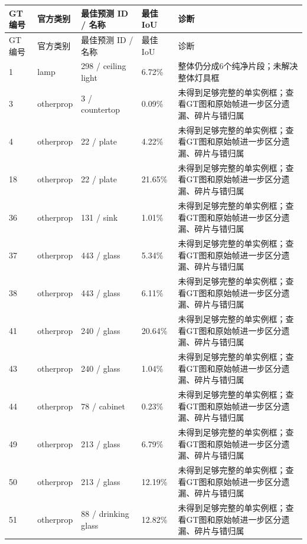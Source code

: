 \documentclass[UTF8,fontset=fandol]{ctexart}
\begin{document}
{\small
\begin{longtable}{|p{}|p{}|p{}|p{}|p{}|}
\hline
GT编号 & 官方类别 & 最佳预测 ID / 名称 & 最佳IoU & 诊断 \\ \hline
\endfirsthead
\hline
GT编号 & 官方类别 & 最佳预测 ID / 名称 & 最佳IoU & 诊断 \\ \hline
\endhead
1 & lamp & 298 / ceiling light & 6.72\% & 整体仍分成6个纯净片段；未解决整体灯具框 \\ \hline
3 & otherprop & 3 / countertop & 0.09\% & 未得到足够完整的单实例框；查看GT图和原始帧进一步区分遗漏、碎片与错归属 \\ \hline
4 & otherprop & 22 / plate & 4.22\% & 未得到足够完整的单实例框；查看GT图和原始帧进一步区分遗漏、碎片与错归属 \\ \hline
18 & otherprop & 22 / plate & 21.65\% & 未得到足够完整的单实例框；查看GT图和原始帧进一步区分遗漏、碎片与错归属 \\ \hline
36 & otherprop & 131 / sink & 1.01\% & 未得到足够完整的单实例框；查看GT图和原始帧进一步区分遗漏、碎片与错归属 \\ \hline
37 & otherprop & 443 / glass & 5.34\% & 未得到足够完整的单实例框；查看GT图和原始帧进一步区分遗漏、碎片与错归属 \\ \hline
38 & otherprop & 443 / glass & 6.11\% & 未得到足够完整的单实例框；查看GT图和原始帧进一步区分遗漏、碎片与错归属 \\ \hline
41 & otherprop & 240 / glass & 20.64\% & 未得到足够完整的单实例框；查看GT图和原始帧进一步区分遗漏、碎片与错归属 \\ \hline
43 & otherprop & 240 / glass & 1.04\% & 未得到足够完整的单实例框；查看GT图和原始帧进一步区分遗漏、碎片与错归属 \\ \hline
44 & otherprop & 78 / cabinet & 0.23\% & 未得到足够完整的单实例框；查看GT图和原始帧进一步区分遗漏、碎片与错归属 \\ \hline
49 & otherprop & 213 / glass & 6.79\% & 未得到足够完整的单实例框；查看GT图和原始帧进一步区分遗漏、碎片与错归属 \\ \hline
50 & otherprop & 213 / glass & 12.19\% & 未得到足够完整的单实例框；查看GT图和原始帧进一步区分遗漏、碎片与错归属 \\ \hline
51 & otherprop & 88 / drinking glass & 12.82\% & 未得到足够完整的单实例框；查看GT图和原始帧进一步区分遗漏、碎片与错归属 \\ \hline

\end{longtable}}
\end{document}
